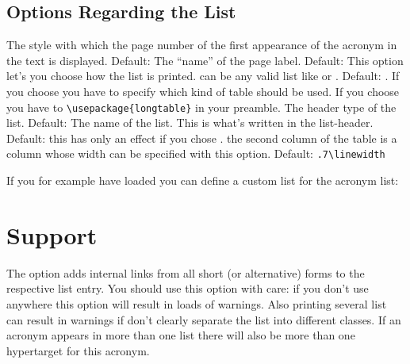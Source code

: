 \documentclass[DIV10,toc=index,toc=bib]{cnpkgdoc}
\begin{document}
\subsection{Options Regarding the List}
\begin{beschreibung}
  The style with which the page number of
 the first appearance of the acronym in the text is displayed. Default: 
  The ``name'' of the page label. Default: 
  This option let's you choose how the list is
 printed.  can be any valid list like  or .
 Default: .
  If you choose 
 you have to specify which kind of table should be used. If you choose 
 you have to \verb+\usepackage{longtable}+ in your preamble.
 The header type of the list. Default: 
  The name of the list. This is what's written in
 the list-header. Default: 
  this has only an effect if you chose .
 the second column of the table is a  column whose width can be specified
 with this option. Default: \verb+.7\linewidth+
\end{beschreibung}

If you for example have loaded  you can define a custom list for
the acronym list:
\begin{beispiel}
 \printacronyms
\end{beispiel}

\section{ Support}
The option  adds internal links from all short (or alternative)
forms to the respective list entry. You should use this option with care: if
you don't use  anywhere this option will result in loads of
 warnings. Also printing several list can result in warnings
if don't clearly separate the list into different classes. If an acronym appears
in more than one list there will also be more than one hypertarget for this
acronym.
\end{document}
